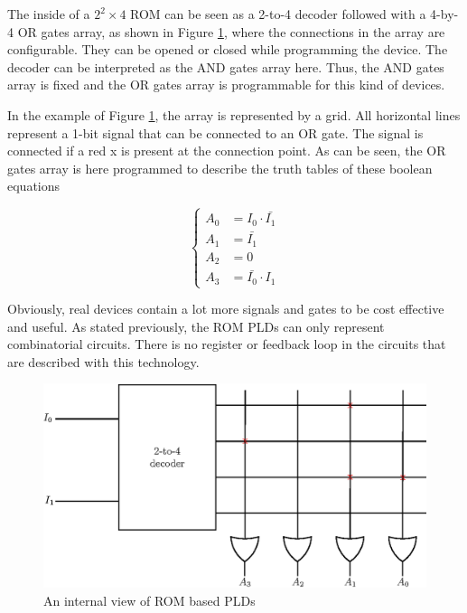 The inside of a $2^2 \times 4$ ROM can be seen as a 2-to-4 decoder followed with a 4-by-4 OR gates 
array, as shown in Figure \ref{fig:fpga/pld_rom_internal}, where the connections in the array are configurable. They can be opened or closed while
programming the device. The decoder can be interpreted as the AND gates array here. Thus, the
AND gates array is fixed and the OR gates array is programmable for this kind of devices.

In the example of Figure \ref{fig:fpga/pld_rom_internal}, the array is represented by a grid. All horizontal lines represent a 1-bit signal
that can be connected to an OR gate. The signal is connected if a red x is present at the connection
point. As can be seen, the OR gates array is here programmed to describe the truth tables of these 
boolean equations

\begin{equation*}
    \begin{cases}
        A_0& = I_0 \cdot \bar{I_1} \\
        A_1& = \bar{I_1} \\
        A_2& = 0 \\
        A_3& = \bar{I_0} \cdot I_1
    \end{cases}
\end{equation*}


Obviously, real devices contain a lot more signals and gates to be cost effective and useful. 
As stated previously, the ROM PLDs can only represent combinatorial circuits. There is no register
or feedback loop in the circuits that are described with this technology.

\begin{figure}[H]
    \centering
    \includegraphics[scale=0.8]{Chapter1-Hardware/res/pld_rom_internal}
    \caption{An internal view of ROM based PLDs}
    \label{fig:fpga/pld_rom_internal}
\end{figure}

